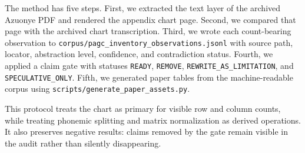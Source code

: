 The method has five steps. First, we extracted the text layer of the archived Azuonye PDF and rendered the appendix chart page. Second, we compared that page with the archived chart transcription. Third, we wrote each count-bearing observation to \texttt{corpus/pagc\_inventory\_observations.jsonl} with source path, locator, abstraction level, confidence, and contradiction status. Fourth, we applied a claim gate with statuses \texttt{READY}, \texttt{REMOVE}, \texttt{REWRITE\_AS\_LIMITATION}, and \texttt{SPECULATIVE\_ONLY}. Fifth, we generated paper tables from the machine-readable corpus using \texttt{scripts/generate\_paper\_assets.py}.

This protocol treats the chart as primary for visible row and column counts, while treating phonemic splitting and matrix normalization as derived operations. It also preserves negative results: claims removed by the gate remain visible in the audit rather than silently disappearing.
